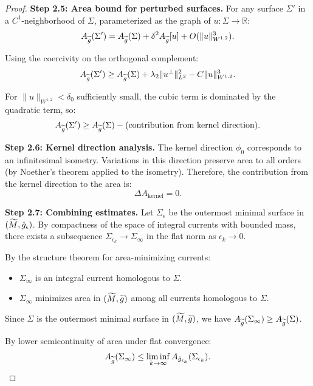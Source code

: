 \begin{proof}
\textbf{Step 2.5: Area bound for perturbed surfaces.}
For any surface $\Sigma'$ in a $C^1$-neighborhood of $\Sigma$, parameterized as the graph of $u: \Sigma \to \mathbb{R}$:
\begin{equation}
    A_{\widetilde{g}}(\Sigma') = A_{\widetilde{g}}(\Sigma) + \delta^2 A_{\widetilde{g}}[u] + O(\|u\|_{W^{1,2}}^3).
\end{equation}

Using the coercivity on the orthogonal complement:
\begin{equation}
    A_{\widetilde{g}}(\Sigma') \ge A_{\widetilde{g}}(\Sigma) + \lambda_2 \|u^\perp\|_{L^2}^2 - C \|u\|_{W^{1,2}}^3.
\end{equation}

For $\|u\|_{W^{1,2}} < \delta_0$ sufficiently small, the cubic term is dominated by the quadratic term, so:
\begin{equation}
    A_{\widetilde{g}}(\Sigma') \ge A_{\widetilde{g}}(\Sigma) - \text{(contribution from kernel direction)}.
\end{equation}

\textbf{Step 2.6: Kernel direction analysis.}
The kernel direction $\phi_0$ corresponds to an infinitesimal isometry. Variations in this direction preserve area to all orders (by Noether's theorem applied to the isometry). Therefore, the contribution from the kernel direction to the area is:
\begin{equation}
    \Delta A_{\text{kernel}} = 0.
\end{equation}

\textbf{Step 2.7: Combining estimates.}
Let $\Sigma_\epsilon$ be the outermost minimal surface in $(\widetilde{M}, \hat{g}_\epsilon)$. By compactness of the space of integral currents with bounded mass, there exists a subsequence $\Sigma_{\epsilon_k} \to \Sigma_\infty$ in the flat norm as $\epsilon_k \to 0$.

By the structure theorem for area-minimizing currents:
\begin{itemize}
    \item $\Sigma_\infty$ is an integral current homologous to $\Sigma$.
    \item $\Sigma_\infty$ minimizes area in $(\widetilde{M}, \widetilde{g})$ among all currents homologous to $\Sigma$.
\end{itemize}

Since $\Sigma$ is the outermost minimal surface in $(\widetilde{M}, \widetilde{g})$, we have $A_{\widetilde{g}}(\Sigma_\infty) \ge A_{\widetilde{g}}(\Sigma)$.

By lower semicontinuity of area under flat convergence:
\begin{equation}
    A_{\widetilde{g}}(\Sigma_\infty) \le \liminf_{k \to \infty} A_{\hat{g}_{\epsilon_k}}(\Sigma_{\epsilon_k}).
\end{equation}


\end{proof}
